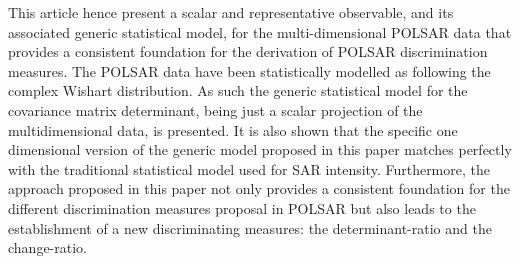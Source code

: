 \documentclass[journal]{IEEEtran}
\begin{document}
This article hence present a scalar and representative observable, and its associated generic statistical model,
  for the multi-dimensional POLSAR data that provides a consistent foundation for the derivation of POLSAR discrimination measures.
The POLSAR data have been statistically modelled as following the complex Wishart distribution.
As such the generic statistical model for the covariance matrix determinant, being just a scalar projection of the multidimensional data, is presented.
It is also shown that
  the specific one dimensional version of the generic model proposed in this paper
  matches perfectly with the traditional statistical model used for SAR intensity.
Furthermore, the approach proposed in this paper
  not only provides a consistent foundation for the different discrimination measures proposal in POLSAR
  but also leads to the establishment of a new discriminating measures: the determinant-ratio and the change-ratio.

\end{document}
